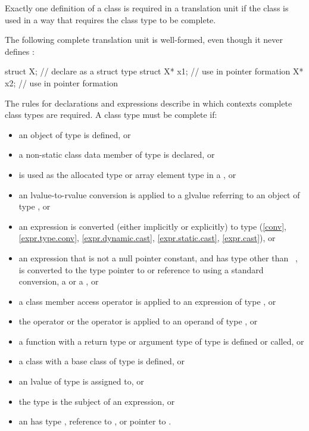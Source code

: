 \pnum
{}%
Exactly one definition of a class is required in a translation unit if
the class is used in a way that requires the class type to be complete.
\begin{example} The following complete translation unit is well-formed,
even though it never defines :

\begin{codeblock}
struct X;                       // declare  as a struct type
struct X* x1;                   // use  in pointer formation
X* x2;                          // use  in pointer formation
\end{codeblock}
\end{example}
\begin{note} The rules for declarations and expressions
describe in which contexts complete class types are required. A class
type  must be complete if:
\begin{itemize}
\item an object of type  is defined, or
\item a non-static class data member of type  is
declared, or
\item {} is used as the allocated type or array element type in a
, or
\item an lvalue-to-rvalue conversion is applied to
a glvalue referring
to an object of type , or
\item an expression is converted (either implicitly or explicitly) to
type  (\ref{conv}, \ref{expr.type.conv},
\ref{expr.dynamic.cast}, \ref{expr.static.cast}, \ref{expr.cast}), or
\item an expression that is not a null pointer constant, and has type
other than \cv{}~, is converted to the type pointer to 
or reference to  using a standard conversion,
a  or
a , or
\item a class member access operator is applied to an expression of type
, or
\item the  operator or the
 operator is applied to an operand of
type , or
\item a function with a return type or argument type of type 
is defined or called, or
\item a class with a base class of type  is
defined, or
\item an lvalue of type  is assigned to, or
\item the type  is the subject of an
 expression, or
\item an  has type , reference to
, or pointer to .
\end{itemize}
\end{note}

